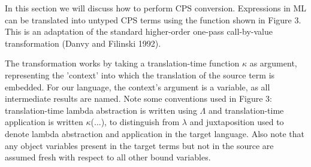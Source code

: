 \documentclass{article}
\theoremstyle{definition}
\theoremstyle{remark}
\numberwithin{equation}{section}
\begin{document}
In this section we will discuss how to perform CPS conversion.
Expressions in ML can be translated into untyped CPS
terms using the function shown in Figure 3. This is an adaptation
of the standard higher-order one-pass call-by-value transformation
(Danvy and Filinski 1992).


The transformation works by taking a translation-time function
$\kappa$ as argument, representing the 'context' into which the translation
of the source term is embedded. For our language, the context's
argument is a variable, as all intermediate results are named.
Note some conventions used in Figure 3: translation-time lambda abstraction
is written using $\mathbb{\Lambda}$ and translation-time application is
written $\kappa$(...), to distinguish from $\lambda$ and juxtaposition
 used to denote lambda abstraction and application in the target language.
 Also note that any object variables present in the target terms but not in
the source are assumed fresh with respect to all other bound variables.

\\

\iffalse

\section{Challenge}
1. The translation rules in Figure 3 is somehow naive. For example, the conversion
of a ML case expression duplicates the context. Consider,
 for example, $f\ (\textsf{case }
x\ \textsf{of in1 } x_1 => e_1|\ \textsf{in2 } x_2 => e_2)$ whose
translation involves two calls to $f$. Modify the rule and your code to eliminate
the code redundancy it causes.

\fi
\end{document}
